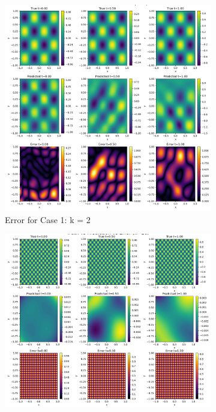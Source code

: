 \documentclass[11pt]{article}
\begin{document}
\begin{figure}[h!]
    \centering
    \begin{subfigure}[b]{0.48\textwidth}
        \includegraphics[width=\textwidth]{2D_Error_K1.png}
        \caption{Error for Case 1: k = 2}
        \label{fig:Error_K1}
    \end{subfigure}
    \hfill
    \begin{subfigure}[b]{0.48\textwidth}
        \includegraphics[width=\textwidth]{2D_Error_K2.png}

\end{subfigure}
\end{figure}
\end{document}
